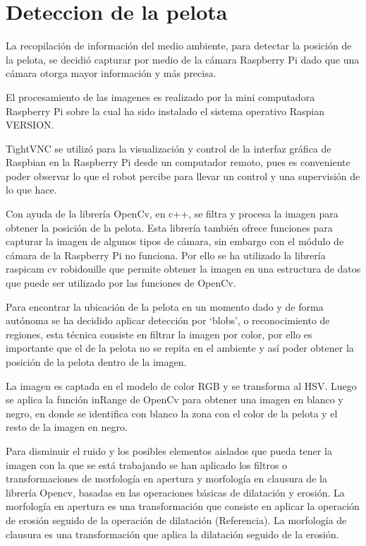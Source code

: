\section{Deteccion de la pelota}\label{chapter:deteccion}


La recopilación de información del medio ambiente, para detectar la posición de la pelota, se decidió capturar por medio de la cámara Raspberry Pi dado que una cámara otorga mayor información y más precisa. 

El procesamiento de las imagenes es realizado por la mini computadora Raspberry Pi sobre la cual ha sido instalado el sistema operativo Raspian VERSION.

TightVNC se utilizó para la visualización y control de la interfaz gráfica de Raspbian en la Raspberry Pi desde un computador remoto, pues es conveniente poder observar lo que el robot percibe para llevar un control y una supervisión de lo que hace.

Con ayuda de la librería OpenCv, en c++, se filtra y procesa la imagen para obtener la posición de la pelota. Esta librería también ofrece funciones para capturar la imagen de algunos tipos de cámara, sin embargo con el módulo de cámara de la Raspberry Pi no funciona. Por ello se ha utilizado la librería raspicam cv robidouille que permite obtener la imagen en una estructura de datos que puede ser utilizado por las funciones de OpenCv. 

Para encontrar la ubicación de la pelota en un momento dado y de forma autónoma se ha decidido aplicar detección por ‘blobs’, o reconocimiento de regiones, esta técnica consiste en filtrar la imagen por color, por ello es importante que el de la pelota no se repita en el ambiente y así poder obtener la posición de la pelota dentro de la imagen.

La imagen es captada en el modelo de color RGB y se transforma al HSV. Luego se aplica la función inRange de OpenCv para obtener una imagen en blanco y negro, en donde se identifica con blanco la zona con el color de la pelota y el resto de la imagen en negro. 

Para disminuir el ruido y los posibles elementos aislados que pueda tener la imagen con la que se está trabajando se han aplicado los filtros o transformaciones de morfología en apertura y morfología en clausura de la librería Opencv, basadas en las operaciones básicas de dilatación y erosión. La morfología en apertura es una transformación que consiste en aplicar la operación de erosión seguido de la operación de dilatación (Referencia). La morfología de clausura es una transformación que aplica la dilatación seguido de la erosión.


